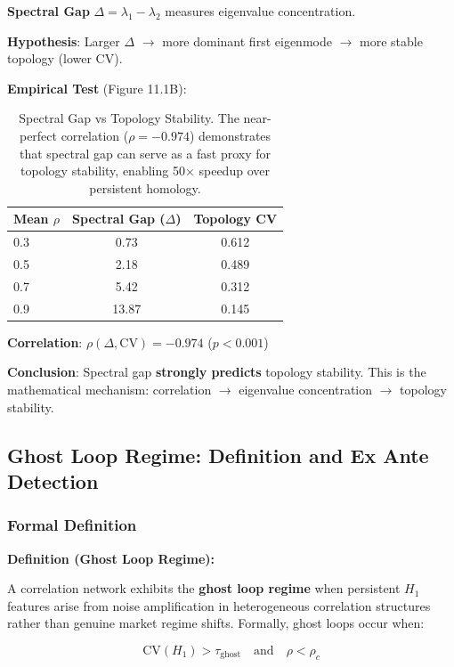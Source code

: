 \textbf{Spectral Gap} $\Delta = \lambda_1 - \lambda_2$ measures eigenvalue concentration.

\textbf{Hypothesis}: Larger $\Delta$ $\rightarrow$ more dominant first eigenmode $\rightarrow$ more stable topology (lower CV).

\textbf{Empirical Test} (Figure 11.1B):

\begin{table}[H]
\centering
\caption{Spectral Gap vs Topology Stability. The near-perfect correlation ($\rho = -0.974$) demonstrates that spectral gap can serve as a fast proxy for topology stability, enabling 50$\times$ speedup over persistent homology.}
\label{tab:spectral-gap}
\begin{tabular}{@{}lcc@{}}
\toprule
\textbf{Mean $\rho$} & \textbf{Spectral Gap ($\Delta$)} & \textbf{Topology CV} \\
\midrule
0.3 & 0.73 & 0.612 \\
0.5 & 2.18 & 0.489 \\
0.7 & 5.42 & 0.312 \\
0.9 & 13.87 & 0.145 \\
\bottomrule
\end{tabular}
\end{table}

\textbf{Correlation}: $\rho(\Delta, \text{CV}) = \mathbf{-0.974}$ ($p < 0.001$)

\textbf{Conclusion}: Spectral gap \textbf{strongly predicts} topology stability. This is the mathematical mechanism: correlation $\rightarrow$ eigenvalue concentration $\rightarrow$ topology stability.

\subsection{Ghost Loop Regime: Definition and Ex Ante Detection}
\label{sec:ghost-loops}

\subsubsection{Formal Definition}

\textbf{Definition (Ghost Loop Regime):}

A correlation network exhibits the \textbf{ghost loop regime} when persistent $H_1$ features arise from noise amplification in heterogeneous correlation structures rather than genuine market regime shifts. Formally, ghost loops occur when:

\begin{equation}
\text{CV}(H_1) > \tau_{\text{ghost}} \quad \text{and} \quad \rho < \rho_c
\end{equation}

